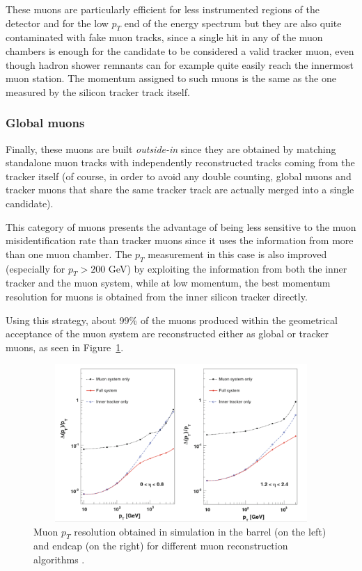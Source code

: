 \documentclass[a4paper, 10pt, openright]{report}
\begin{document}
These muons are particularly efficient for less instrumented regions of the detector and for the low $p_T$ end of the energy spectrum but they are also quite contaminated with fake muon tracks, since a single hit in any of the muon chambers is enough for the candidate to be considered a valid tracker muon, even though hadron shower remnants can for example quite easily reach the innermost muon station. The momentum assigned to such muons is the same as the one measured by the silicon tracker track itself.

\subsubsection*{Global muons}
Finally, these muons are built \textit{outside-in} since they are obtained by matching standalone muon tracks with independently reconstructed tracks coming from the tracker itself (of course, in order to avoid any double counting, global muons and tracker muons that share the same tracker track are actually merged into a single candidate). 

This category of muons presents the advantage of being less sensitive to the muon misidentification rate than tracker muons since it uses the information from more than one muon chamber. The $p_T$ measurement in this case is also improved (especially for $p_T > 200$ GeV) by exploiting the information from both the inner tracker and the muon system, while at low momentum, the best momentum resolution for muons is obtained from the inner silicon tracker directly.

Using this strategy, about 99\% of the muons produced within the geometrical acceptance of the muon system are reconstructed either as global or tracker muons, as seen in Figure~\ref{fig:MuonEff2}.

\begin{figure}[htbp]
\begin{center}
\includegraphics[width=12cm, height=6cm]{figs/MuonEff.png}
\caption{Muon $p_T$ resolution obtained in simulation in the barrel (on the left) and endcap (on the right) for different muon reconstruction algorithms \cite{Quarkonium}.}
\label{fig:MuonEff2}
\end{center}
\end{figure}
\end{document}
